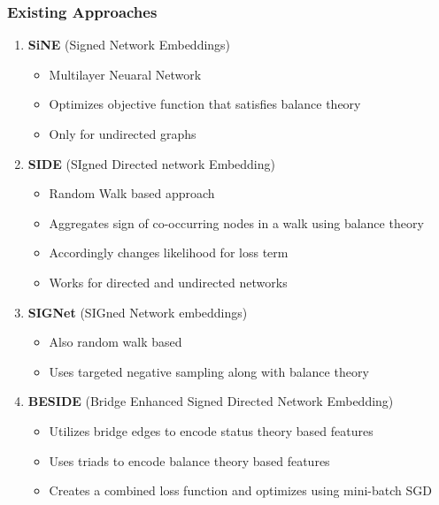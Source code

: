 \documentclass{beamer}
\begin{document}
\begin{frame}
    \frametitle{Existing Approaches}
    \begin{enumerate}
        \item \textbf{SiNE} (Signed Network Embeddings) \cite{Wang2017SiNE}
        \begin{itemize}
            \item<2-> Multilayer Neuaral Network
            \item<2-> Optimizes objective function that satisfies balance theory
            \item<2-> Only for undirected graphs
        \end{itemize}
        \item \textbf{SIDE} (SIgned Directed network Embedding) \cite{Kim2018_SIDE}
        \begin{itemize}
            \item<3-> Random Walk based approach
            \item<3-> Aggregates sign of co-occurring nodes in a walk using balance theory
            \item<3-> Accordingly changes likelihood for loss term
            \item<3-> Works for directed and undirected networks
        \end{itemize}
        \item \textbf{SIGNet} (SIGned Network embeddings) \cite{Islam_2018_sign2vec}
        \begin{itemize}
            \item<4-> Also random walk based
            \item<4-> Uses targeted negative sampling along with balance theory
        \end{itemize}
        \item \textbf{BESIDE} (Bridge Enhanced Signed Directed Network Embedding) \cite{Chen2018_BESIDE}
        \begin{itemize}
            \item<5-> Utilizes bridge edges to encode status theory based features
            \item<5-> Uses triads to encode balance theory based features
            \item<5-> Creates a combined loss function and optimizes using mini-batch SGD
        \end{itemize}
    \end{enumerate}
\end{frame}
\end{document}
